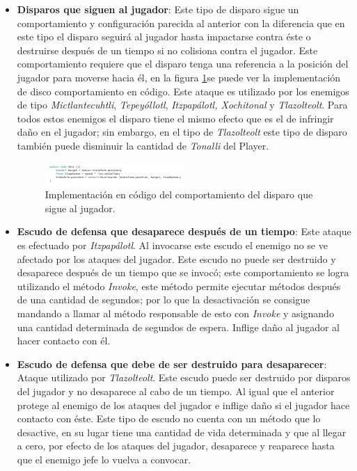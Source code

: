 \begin{itemize}
        \item \textbf{Disparos que siguen al jugador}: Este tipo de disparo sigue un
        comportamiento y configuración parecida al anterior con la diferencia que en
        este tipo el disparo seguirá al jugador hasta impactarse contra éste o
        destruirse después de un tiempo si no colisiona contra el jugador. Este
        comportamiento requiere que el disparo tenga una referencia a la posición del
        jugador para moverse hacia él, en la figura \ref{fig:FollowedShot}se puede ver
        la implementación de disco comportamiento en código. Este ataque es utilizado
        por los enemigos de tipo \textit{Mictlantecuhtli}, \textit{Tepeyóllotl},
        \textit{Itzpapálotl, Xochitonal} y \textit{Tlazolteolt}. Para todos estos
        enemigos el disparo tiene el mismo efecto que es el de infringir
        daño en el jugador; sin embargo, en el tipo de \textit{Tlazolteolt} este tipo de
        disparo también puede disminuir la cantidad de \textit{Tonalli} del Player.
            
            \begin{figure}[h]
                \centering
                \includegraphics[width=0.5\textwidth]{03TrabajoRealizado/imagenes/disparoSigue.png}
                \caption{Implementación en código del comportamiento del disparo que sigue al jugador.}
                \label{fig:FollowedShot}
            \end{figure}        
        
        \item \textbf{Escudo de defensa que desaparece después de un tiempo}: Este
        ataque es efectuado por \textit{Itzpapálotl}. Al invocarse este escudo el
        enemigo no se ve afectado por los ataques del jugador. Este escudo no puede ser
        destruido y desaparece después de un tiempo que se invocó; este comportamiento
        se logra utilizando el método \textit{Invoke}, este método permite ejecutar
        métodos después de una cantidad de segundos; por lo que la desactivación se
        consigue mandando a llamar al método responsable de esto con \textit{Invoke}
        y asignando una cantidad determinada de segundos de espera.
        Inflige daño al jugador al hacer contacto con él.

        \item \textbf{Escudo de defensa que debe de ser destruido para desaparecer}:
        Ataque utilizado por \textit{Tlazolteolt}. Este escudo puede ser destruido
        por disparos del jugador y no desaparece al cabo de un tiempo. Al igual que el
        anterior protege al enemigo de los ataques del jugador e inflige daño si el
        jugador hace contacto con éste. Este tipo de escudo no cuenta con un método
        que lo desactive, en su lugar tiene una cantidad de vida determinada y que
        al llegar a cero, por efecto de los ataques del jugador, desaparece y reaparece
        hasta que el enemigo jefe lo vuelva a convocar.


\end{itemize}
